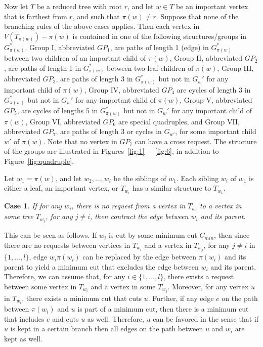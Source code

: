 \documentclass[11pt]{article}
\newtheorem{case}[theorem]{Case}
\begin{document}
Now let $T$ be a reduced tree with root $r$, and let $w \in T$ be an important vertex that is farthest from $r$, and such that $\pi(w) \neq r$. Suppose that none of the branching rules of the above cases applies. Then each vertex in $V(T_{\pi(w)}) - \pi(w)$ is contained in one of the following structures/groups in $G^*_{\pi(w)}$. Group I, abbreviated $GP_1$, are paths of length 1 (edge) in $G^*_{\pi(w)}$ between two children of an important child of $\pi(w)$, Group II, abbreviated $GP_2$, are paths of length 1 in $G^*_{\pi(w)}$ between two leaf children of $\pi(w)$, Group III, abbreviated $GP_3$, are paths of length 3 in $G^*_{\pi(w)}$ but not in $G_w'$ for any important child of $\pi(w)$, Group IV, abbreviated $GP_4$ are cycles of length 3 in $G^*_{\pi(w)}$ but not in $G_w'$ for any important child of $\pi(w)$, Group V, abbreviated $GP_5$, are cycles of lengths 5 in $G^*_{\pi(w)}$  but not in $G_w'$ for any important child of $\pi(w)$, Group VI, abbreviated $GP_6$ are special quadruples, and Group VII, abbreviated $GP_7$, are paths of length $3$ or cycles in $G_{w'}$, for some important child $w'$ of $\pi(w)$. Note that no vertex in $GP_7$ can have a cross request. The structure of the groups are illustrated in Figures~\ref{fig:1}~--~\ref{fig:6}, in addition to Figure~\ref{fig:quadruple}.



Let $w_1 = \pi(w)$, and let $w_2, \ldots, w_l$ be the siblings of $w_1$. Each sibling $w_i$ of $w_1$ is either a leaf, an important vertex, or $T_{w_i}$ has a similar structure to $T_{w_1}$.

\begin{case}
\label{case:100}
If for any $w_i$, there is no request from a vertex in $T_{w_i}$ to a vertex in some tree $T_{w_j}$, for any $j\neq i$, then contract the edge between $w_i$ and its parent.
\end{case}
This can be seen as follows. If $w_i$ is cut by some minimum cut $C_{min}$, then since there are no requests between vertices in $T_{w_i}$ and a vertex in $T_{w_j}$, for any $j \neq i$ in $\{1, \ldots, l\}$, edge $w_i\pi(w_i)$ can be replaced by the edge between $\pi(w_i)$ and its parent to yield a minimum cut that excludes the edge between $w_i$ and its parent. Therefore, we can assume that, for any $i \in \{1, \ldots, l\}$, there exists a request between some vertex in $T_{w_i}$ and a vertex in some $T_{w_j}$. Moreover, for any vertex $u$ in $T_{w_i}$, there exists a minimum cut that cuts $u$. Further, if any edge $e$ on the path between $\pi(w_i)$ and $u$ is part of a minimum cut, then there is a minimum cut that includes $e$ and cuts $u$ as well. Therefore, $u$ can be favored in the sense that if $u$ is kept in a certain branch then all edges on the path between $u$ and $w_i$ are kept as well.
\end{document}
